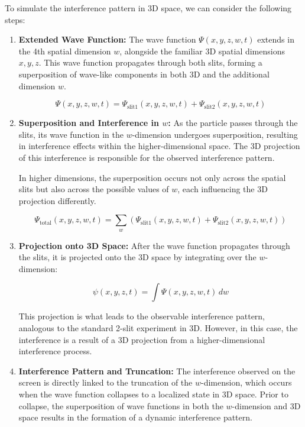 \documentclass[12pt]{article}
\begin{document}
To simulate the interference pattern in 3D space, we can consider the following steps:

\begin{enumerate}
    \item \textbf{Extended Wave Function:} The wave function \( \Psi(x, y, z, w, t) \) extends in the 4th spatial dimension \( w \), alongside the familiar 3D spatial dimensions \( x, y, z \). This wave function propagates through both slits, forming a superposition of wave-like components in both 3D and the additional dimension \( w \).
   
    \begin{equation}
    \Psi(x, y, z, w, t) = \Psi_{\text{slit1}}(x, y, z, w, t) + \Psi_{\text{slit2}}(x, y, z, w, t)
    \end{equation}
    
    \item \textbf{Superposition and Interference in \( w \):} As the particle passes through the slits, its wave function in the \( w \)-dimension undergoes superposition, resulting in interference effects within the higher-dimensional space. The 3D projection of this interference is responsible for the observed interference pattern.
   
    In higher dimensions, the superposition occurs not only across the spatial slits but also across the possible values of \( w \), each influencing the 3D projection differently.
   
    \begin{equation}
    \Psi_{\text{total}}(x, y, z, w, t) = \sum_{w} \left( \Psi_{\text{slit1}}(x, y, z, w, t) + \Psi_{\text{slit2}}(x, y, z, w, t) \right)
    \end{equation}

    \item \textbf{Projection onto 3D Space:} After the wave function propagates through the slits, it is projected onto the 3D space by integrating over the \( w \)-dimension:
   
    \begin{equation}
    \psi(x, y, z, t) = \int \Psi(x, y, z, w, t) \, dw
    \end{equation}
   
    This projection is what leads to the observable interference pattern, analogous to the standard 2-slit experiment in 3D. However, in this case, the interference is a result of a 3D projection from a higher-dimensional interference process.
   
    \item \textbf{Interference Pattern and Truncation:} The interference observed on the screen is directly linked to the truncation of the \( w \)-dimension, which occurs when the wave function collapses to a localized state in 3D space. Prior to collapse, the superposition of wave functions in both the \( w \)-dimension and 3D space results in the formation of a dynamic interference pattern.
\end{enumerate}
\end{document}
